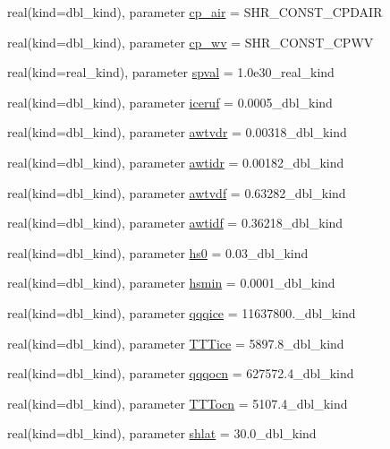 \begin{DoxyCompactItemize}
real(kind=dbl\_\-kind), parameter \hyperlink{namespaceice__constants_a36c2903a1fdb4ce659dd1012f8abdfae}{cp\_\-air} = SHR\_\-CONST\_\-CPDAIR
\item 
real(kind=dbl\_\-kind), parameter \hyperlink{namespaceice__constants_ab75b8b01ca0c808ceaf81ceaea962456}{cp\_\-wv} = SHR\_\-CONST\_\-CPWV
\item 
real(kind=real\_\-kind), parameter \hyperlink{namespaceice__constants_a9c8695ae78220caf5148da03217658d9}{spval} = 1.0e30\_\-real\_\-kind
\item 
real(kind=dbl\_\-kind), parameter \hyperlink{namespaceice__constants_ac29badea7fe3d80ca6d1de8376b17836}{iceruf} = 0.0005\_\-dbl\_\-kind
\item 
real(kind=dbl\_\-kind), parameter \hyperlink{namespaceice__constants_a54bc2a8589e9b5c12512590fc9171b91}{awtvdr} = 0.00318\_\-dbl\_\-kind
\item 
real(kind=dbl\_\-kind), parameter \hyperlink{namespaceice__constants_aee8c086e084aac138032d1c7c0a67c6a}{awtidr} = 0.00182\_\-dbl\_\-kind
\item 
real(kind=dbl\_\-kind), parameter \hyperlink{namespaceice__constants_a24c072f6d6610938c97469566905b897}{awtvdf} = 0.63282\_\-dbl\_\-kind
\item 
real(kind=dbl\_\-kind), parameter \hyperlink{namespaceice__constants_a0b473656091f340d3c9f721dec4fad43}{awtidf} = 0.36218\_\-dbl\_\-kind
\item 
real(kind=dbl\_\-kind), parameter \hyperlink{namespaceice__constants_afb193f4389586bacd30b4382b1ca21c5}{hs0} = 0.03\_\-dbl\_\-kind
\item 
real(kind=dbl\_\-kind), parameter \hyperlink{namespaceice__constants_aabb18cc60f80f91072acd8182b2776af}{hsmin} = 0.0001\_\-dbl\_\-kind
\item 
real(kind=dbl\_\-kind), parameter \hyperlink{namespaceice__constants_a99597a5a1a0a2eb223e155e209b95538}{qqqice} = 11637800.\_\-dbl\_\-kind
\item 
real(kind=dbl\_\-kind), parameter \hyperlink{namespaceice__constants_abca4267cd2edc853a5213d463487c28f}{TTTice} = 5897.8\_\-dbl\_\-kind
\item 
real(kind=dbl\_\-kind), parameter \hyperlink{namespaceice__constants_a6768cc2f1ba89cd471ab5fd955e839c1}{qqqocn} = 627572.4\_\-dbl\_\-kind
\item 
real(kind=dbl\_\-kind), parameter \hyperlink{namespaceice__constants_a79068c1f0079cf6a81045ae75ef7d30f}{TTTocn} = 5107.4\_\-dbl\_\-kind
\item 
real(kind=dbl\_\-kind), parameter \hyperlink{namespaceice__constants_a899f02a446bdd286d3047a7bd80f6dec}{shlat} = 30.0\_\-dbl\_\-kind

\end{DoxyCompactItemize}
